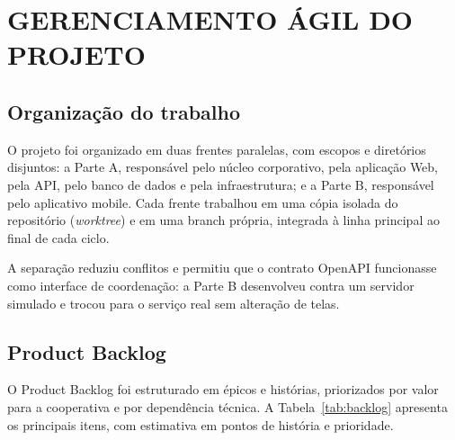 \section{GERENCIAMENTO ÁGIL DO PROJETO}

\subsection{Organização do trabalho}

O projeto foi organizado em duas frentes paralelas, com escopos e diretórios
disjuntos: a Parte A, responsável pelo núcleo corporativo, pela aplicação Web,
pela API, pelo banco de dados e pela infraestrutura; e a Parte B, responsável
pelo aplicativo mobile. Cada frente trabalhou em uma cópia isolada do repositório
(\emph{worktree}) e em uma branch própria, integrada à linha principal ao final
de cada ciclo.

A separação reduziu conflitos e permitiu que o contrato OpenAPI funcionasse
como interface de coordenação: a Parte B desenvolveu contra um servidor simulado
e trocou para o serviço real sem alteração de telas.

\subsection{Product Backlog}

O Product Backlog foi estruturado em épicos e histórias, priorizados por valor
para a cooperativa e por dependência técnica. A Tabela~\ref{tab:backlog} apresenta
os principais itens, com estimativa em pontos de história e prioridade.

